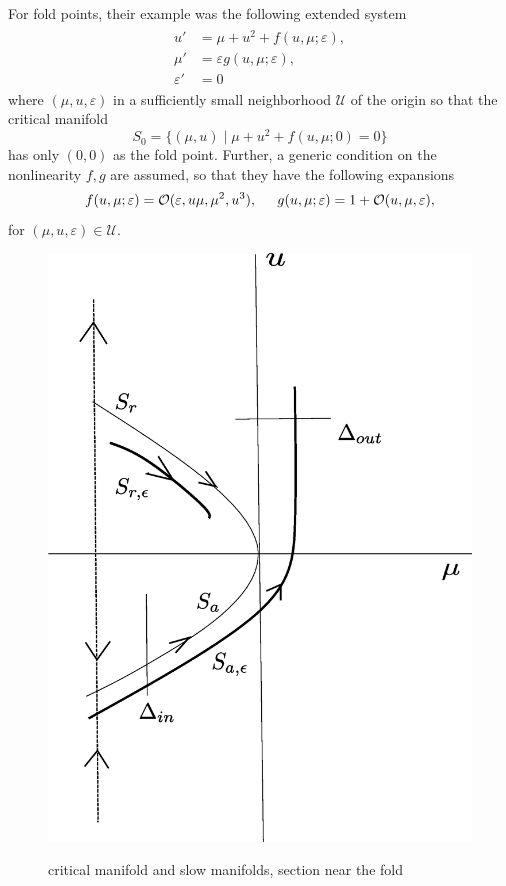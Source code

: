\documentclass[letterpaper,11pt]{article}
\newcommand{\rmO}{\mathcal{O}}
\newcommand{\eps}{\varepsilon}
\numberwithin{equation}{section}
\theoremstyle{plain}
\begin{document}
For fold points, their example was the following extended system 
\begin{align}\label{ori_eqn}
\begin{split}
u' &= \mu+u^2+ f(u,\mu; \eps),\\
\mu' &=  \eps g(u,\mu; \eps), \\
\eps' &= 0
\end{split}
\end{align}
where $(\mu, u, \eps)$ in a sufficiently small neighborhood $\mathcal{U}$ of the origin so that the critical manifold 
\[
S_0 = \{ (\mu, u) \mid \mu + u^2 +f (u,\mu ;0) = 0\}
\]
 has only $(0,0)$ as the fold point.
 Further, a generic condition on the nonlinearity $f, g$ are assumed, so that they have the following expansions
\begin{equation} \label{fold_nonlinearity}
f(u,\mu;\eps) = \rmO(\eps, u\mu,\mu^2,u^3),\hspace{0.2in}
g(u,\mu;\eps) = 1+\rmO(u,\mu,\eps),
\end{equation} 
for $(\mu, u,\eps) \in \mathcal{U}$.

\begin{figure}[ht]
 \centering %
 \scalebox{0.3} %
 {\includegraphics{pictures/passage_fold.eps}} %
 \caption{critical manifold and slow manifolds, section near the fold}\label{fig:passage}
\end{figure}
\end{document}
